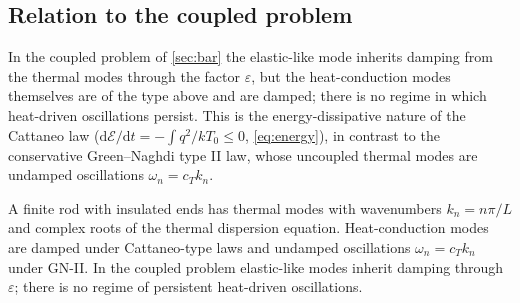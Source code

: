 \subsection{Relation to the coupled problem}
In the coupled problem of \cref{sec:bar} the elastic-like mode inherits damping from the thermal modes through the factor $\varepsilon$, but the heat-conduction modes themselves are of the type above and are damped; there is no regime in which heat-driven oscillations persist. This is the energy-dissipative nature of the Cattaneo law ($\mathrm{d}\mathcal E/\mathrm{d}t=-\int q^2/kT_0\le0$, \cref{eq:energy}), in contrast to the conservative Green--Naghdi type II law, whose uncoupled thermal modes are undamped oscillations $\omega_n=c_Tk_n$.

\begin{summarybox}[Summary]
A finite rod with insulated ends has thermal modes with wavenumbers $k_n=n\pi/L$ and complex roots of the thermal dispersion equation. Heat-conduction modes are damped under Cattaneo-type laws and undamped oscillations $\omega_n=c_Tk_n$ under GN-II. In the coupled problem elastic-like modes inherit damping through $\varepsilon$; there is no regime of persistent heat-driven oscillations.
\end{summarybox}
